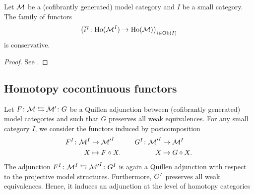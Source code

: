 \begin{proposition}\label{prop:der2} Let $\M$ be a (cofibrantly generated) model
category and $I$ be a small category. The family of functors
  \[ \left(\GZ{i^*} \colon \Loc{\fun{I}{\M}}\to \Loc{\M}\right)_{i \in
\Ob(I)}
  \] is conservative.
\end{proposition}
\begin{proof}
  See \cite[Lemme 2.4]{cisinski:images}.
\end{proof}
\subsection{Homotopy cocontinuous functors}\label{hptycocts}
\begin{paragr}\label{paragr:univmor} Let $F \colon \M \leftrightarrows \M' \colon G$ be a
  Quillen adjunction between (cofibrantly generated) model categories
  and such that $G$ preserves all weak equivalences. For any small
category $I$, we consider the functors induced by postcomposition
  \[\begin{aligned} \fun{I}{F} \colon \fun{I}{\M} &\to \fun{I}{\M'}\\ X &\mapsto
F\circ X.
  \end{aligned} \quad \quad \begin{aligned} \fun{I}{G} \colon \fun{I}{\M'} &\to \fun{I}{\M}\\ X &\mapsto
G\circ X.
  \end{aligned}\]
The adjunction $\fun{I}{F} \colon \fun{I}{\M} \leftrightarrows
\fun{I}{\M'} \colon \fun{I}{G}$ is again a Quillen adjunction with
respect to the projective model structures. Furthermore, $\fun{I}{G}$
preserves all weak equivalences. Hence, it induces an adjunction at
the level of homotopy categories


\end{paragr}
